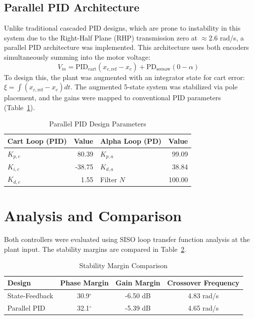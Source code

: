 \documentclass[11pt,a4paper]{article}
\begin{document}
\subsection{Parallel PID Architecture}
Unlike traditional cascaded PID designs, which are prone to instability in this system due to the Right-Half Plane (RHP) transmission zero at $\approx 2.6$ rad/s, a parallel PID architecture was implemented. This architecture uses both encoders simultaneously summing into the motor voltage:
\begin{equation}
    V_m = \text{PID}_{\text{cart}}(x_{c,\text{ref}} - x_c) + \text{PD}_{\text{seesaw}}(0 - \alpha)
\end{equation}
To design this, the plant was augmented with an integrator state for cart error: $\xi = \int (x_{c,\text{ref}} - x_c) dt$. The augmented 5-state system was stabilized via pole placement, and the gains were mapped to conventional PID parameters (Table~\ref{tab:pid_gains}).

\begin{table}[H]
    \centering
    \caption{Parallel PID Design Parameters}
    \label{tab:pid_gains}
    \begin{tabular}{l r | l r}
        \toprule
        Cart Loop (PID) & Value & Alpha Loop (PD) & Value \\
        \midrule
        $K_{p,c}$ & 80.39 & $K_{p,a}$ & 99.09 \\
        $K_{i,c}$ & -38.75 & $K_{d,a}$ & 38.84 \\
        $K_{d,c}$ & 1.55 & Filter $N$ & 100.00 \\
        \bottomrule
    \end{tabular}
\end{table}

\section{Analysis and Comparison}
Both controllers were evaluated using SISO loop transfer function analysis at the plant input. The stability margins are compared in Table~\ref{tab:margins}.

\begin{table}[H]
    \centering
    \caption{Stability Margin Comparison}
    \label{tab:margins}
    \begin{tabular}{l c c c}
        \toprule
        Design & Phase Margin & Gain Margin & Crossover Frequency \\
        \midrule
        State-Feedback & 30.9$^\circ$ & -6.50 dB & 4.83 rad/s \\
        Parallel PID & 32.1$^\circ$ & -5.39 dB & 4.65 rad/s \\
        \bottomrule
    \end{tabular}
\end{table}
\end{document}
